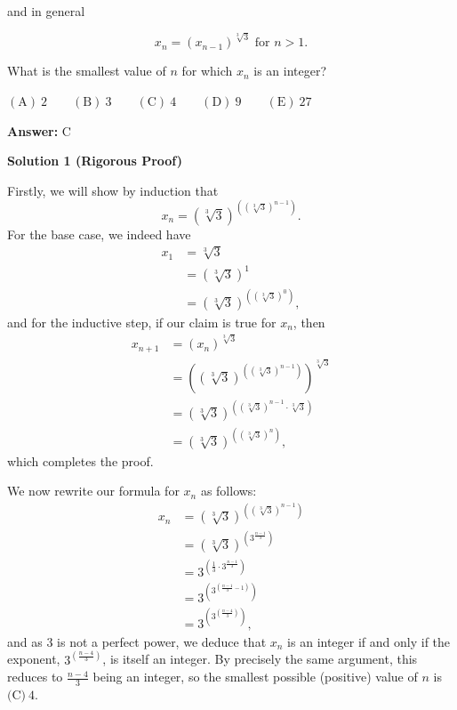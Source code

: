 \begin{enumerate}
and in general

 \[x_n = \left(x_{n-1}\right)^{\sqrt[3]{3}} \text{ for } n > 1.\]


 What is the smallest value of $n$ for which $x_n$ is an integer?


 $\mathrm{(A)\ } 2 \qquad \mathrm{(B) \ }3 \qquad \mathrm{(C) \  } 4 \qquad \mathrm{(D) \  } 9 \qquad \mathrm{(E) \  }27$

 \textbf{Answer: }C



\textbf{Solution 1 (Rigorous Proof)}

Firstly, we will show by induction that 
 \[x_n = \left(\sqrt[3]{3}\right)^{\left(\left(\sqrt[3]{3}\right)^{n-1}\right)}.\] For the base case, we indeed have 
 \begin{align*}x_1 &= \sqrt[3]{3} \\ &= \left(\sqrt[3]{3}\right)^1 \\ &= \left(\sqrt[3]{3}\right)^{\left(\left(\sqrt[3]{3}\right)^0\right)},\end{align*}
 and for the inductive step, if our claim is true for $x_n$, then 
 \begin{align*}x_{n+1} &= \left(x_n\right)^{\sqrt[3]{3}} \\ &= \left(\left(\sqrt[3]{3}\right)^{\left(\left(\sqrt[3]{3}\right)^{n-1}\right)}\right)^{\sqrt[3]{3}} \\ &= \left(\sqrt[3]{3}\right)^{\left(\left(\sqrt[3]{3}\right)^{n-1}\cdot\sqrt[3]{3}\right)} \\ &= \left(\sqrt[3]{3}\right)^{\left(\left(\sqrt[3]{3}\right)^n\right)},\end{align*}
 which completes the proof.

 We now rewrite our formula for $x_n$ as follows:
 \begin{align*}x_n &= \left(\sqrt[3]{3}\right)^{\left(\left(\sqrt[3]{3}\right)^{n-1}\right)} \\ &= \left(\sqrt[3]{3}\right)^{\left(3^{\frac{n-1}{3}}\right)} \\ &=3^{\left(\frac{1}{3} \cdot 3^{\frac{n-1}{3}}\right)} \\ &= 3^{\left(3^{\left(\frac{n-1}{3}-1\right)}\right)} \\ &= 3^{\left(3^{\left(\frac{n-4}{3}\right)}\right)},\end{align*}
and as $3$ is not a perfect power, we deduce that $x_n$ is an integer if and only if the exponent, $3^{\left(\frac{n-4}{3}\right)}$, is itself an integer. By precisely the same argument, this reduces to $\frac{n-4}{3}$ being an integer, so the smallest possible (positive) value of $n$ is $\boxed{\text{(C)} \ 4}$.


\end{enumerate}
